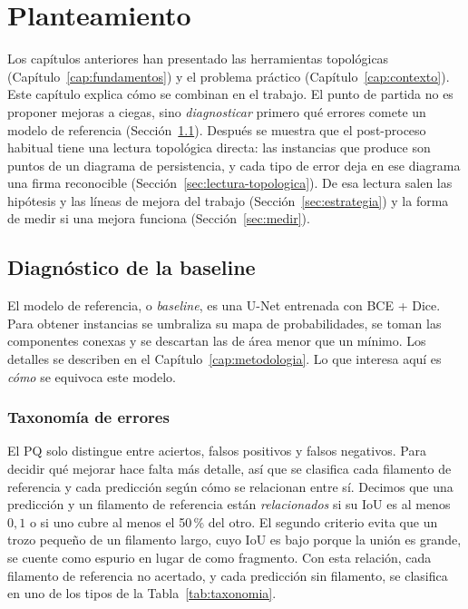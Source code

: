
\chapter{Planteamiento}
\label{cap:planteamiento}

Los capítulos anteriores han presentado las herramientas topológicas
(Capítulo~\ref{cap:fundamentos}) y el problema práctico
(Capítulo~\ref{cap:contexto}). Este capítulo explica cómo se combinan en
el trabajo. El punto de partida no es proponer mejoras a ciegas, sino
\emph{diagnosticar} primero qué errores comete un modelo de referencia
(Sección~\ref{sec:diagnostico}). Después se muestra que el post-proceso
habitual tiene una lectura topológica directa: las instancias que produce
son puntos de un diagrama de persistencia, y cada tipo de error deja en
ese diagrama una firma reconocible (Sección~\ref{sec:lectura-topologica}).
De esa lectura salen las hipótesis y las líneas de mejora del trabajo
(Sección~\ref{sec:estrategia}) y la forma de medir si una mejora funciona
(Sección~\ref{sec:medir}).

\section{Diagnóstico de la baseline}
\label{sec:diagnostico}

El modelo de referencia, o \emph{baseline}, es una U-Net entrenada con
BCE + Dice. Para obtener instancias se umbraliza su mapa de
probabilidades, se toman las componentes conexas y se descartan las de
área menor que un mínimo. Los detalles se describen en el
Capítulo~\ref{cap:metodologia}. Lo que interesa aquí es \emph{cómo} se
equivoca este modelo.

\subsection{Taxonomía de errores}

El PQ solo distingue entre aciertos, falsos positivos y falsos negativos.
Para decidir qué mejorar hace falta más detalle, así que se clasifica
cada filamento de referencia y cada predicción según cómo se relacionan
entre sí. Decimos que una predicción y un filamento de referencia están
\emph{relacionados} si su IoU es al menos $0{,}1$ o si uno cubre al menos
el 50\,\% del otro. El segundo criterio evita que un trozo pequeño de un
filamento largo, cuyo IoU es bajo porque la unión es grande, se cuente
como espurio en lugar de como fragmento. Con esta relación, cada
filamento de referencia no acertado, y cada predicción sin filamento, se
clasifica en uno de los tipos de la Tabla~\ref{tab:taxonomia}.

